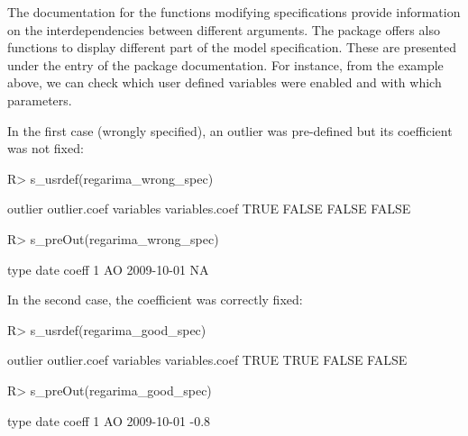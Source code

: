 \documentclass[article]{jss}
\begin{document}
The documentation for the functions modifying specifications provide
information on the interdependencies between different arguments. The
package offers also functions to display different part of the model
specification. These are presented under the entry 
of the package documentation. For instance, from the example above, we
can check which user defined variables were enabled and with which
parameters.

In the first case (wrongly specified), an outlier was pre-defined but
its coefficient was not fixed:

\begin{CodeChunk}

\begin{CodeInput}
R> s_usrdef(regarima_wrong_spec)
\end{CodeInput}

\begin{CodeOutput}
 outlier outlier.coef variables variables.coef
    TRUE        FALSE     FALSE          FALSE
\end{CodeOutput}

\begin{CodeInput}
R> s_preOut(regarima_wrong_spec)
\end{CodeInput}

\begin{CodeOutput}
  type       date coeff
1   AO 2009-10-01    NA
\end{CodeOutput}
\end{CodeChunk}

In the second case, the coefficient was correctly fixed:

\begin{CodeChunk}

\begin{CodeInput}
R> s_usrdef(regarima_good_spec)
\end{CodeInput}

\begin{CodeOutput}
 outlier outlier.coef variables variables.coef
    TRUE         TRUE     FALSE          FALSE
\end{CodeOutput}

\begin{CodeInput}
R> s_preOut(regarima_good_spec)
\end{CodeInput}

\begin{CodeOutput}
  type       date coeff
1   AO 2009-10-01  -0.8
\end{CodeOutput}
\end{CodeChunk}
\end{document}
